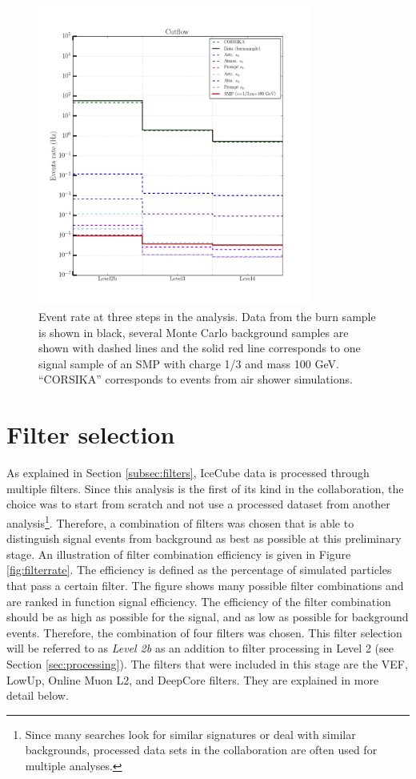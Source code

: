 \begin{figure}
\centering
\includegraphics[width=0.8\textwidth]{chapter8/img/CutFlow_Level2b_Level3_Level4.png}
\caption{Event rate at three steps in the analysis. Data from the burn sample is shown in black, several Monte Carlo background samples are shown with dashed lines and the solid red line corresponds to one signal sample of an SMP with charge 1/3 and mass 100 GeV. ``CORSIKA'' corresponds to events from air shower simulations.}
\label{fig:cutflow}
\end{figure}


\section{Filter selection}
\label{sec:filterselection}
As explained in Section \ref{subsec:filters}, IceCube data is processed through multiple filters. Since this analysis is the first of its kind in the collaboration, the choice was to start from scratch and not use a processed dataset from another analysis\footnote{Since many searches look for similar signatures or deal with similar backgrounds, processed data sets in the collaboration are often used for multiple analyses.}. Therefore, a combination of filters was chosen that is able to distinguish signal events from background as best as possible at this preliminary stage. An illustration of filter combination efficiency is given in Figure \ref{fig:filterrate}. The efficiency is defined as the percentage of simulated particles that pass a certain filter. The figure shows many possible filter combinations and are ranked in function signal efficiency. The efficiency of the filter combination should be as high as possible for the signal, and as low as possible for background events. Therefore, the combination of four filters was chosen. This filter selection will be referred to as \textit{Level 2b} as an addition to filter processing in Level 2 (see Section \ref{sec:processing}). The filters that were included in this stage are the VEF, LowUp, Online Muon L2, and DeepCore filters. They are explained in more detail below. 

